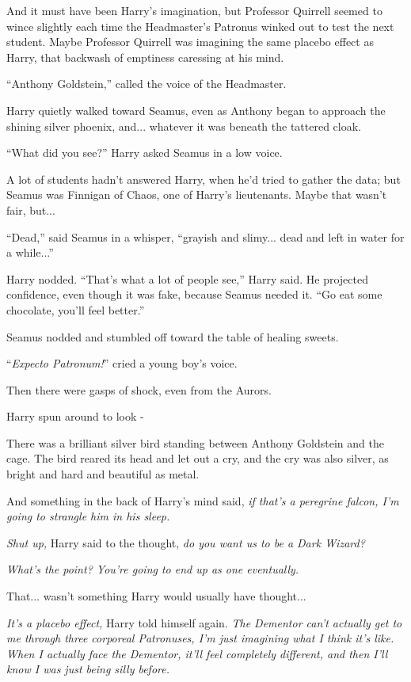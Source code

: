 And it must have been Harry's imagination, but Professor Quirrell seemed to wince slightly each time the Headmaster's Patronus winked out to test the next student. Maybe Professor Quirrell was imagining the same placebo effect as Harry, that backwash of emptiness caressing at his mind.

``Anthony Goldstein,'' called the voice of the Headmaster.

Harry quietly walked toward Seamus, even as Anthony began to approach the shining silver phoenix, and... whatever it was beneath the tattered cloak.

``What did you see?'' Harry asked Seamus in a low voice.

A lot of students hadn't answered Harry, when he'd tried to gather the data; but Seamus was Finnigan of Chaos, one of Harry's lieutenants. Maybe that wasn't fair, but...

``Dead,'' said Seamus in a whisper, ``grayish and slimy... dead and left in water for a while...''

Harry nodded. ``That's what a lot of people see,'' Harry said. He projected confidence, even though it was fake, because Seamus needed it. ``Go eat some chocolate, you'll feel better.''

Seamus nodded and stumbled off toward the table of healing sweets.

``\emph{Expecto Patronum!}'' cried a young boy's voice.

Then there were gasps of shock, even from the Aurors.

Harry spun around to look -

There was a brilliant silver bird standing between Anthony Goldstein and the cage. The bird reared its head and let out a cry, and the cry was also silver, as bright and hard and beautiful as metal.

And something in the back of Harry's mind said, \emph{if that's a peregrine falcon, I'm going to strangle him in his sleep.}

\emph{Shut up,} Harry said to the thought, \emph{do you want us to be a Dark Wizard?}

\emph{What's the point? You're going to end up as one eventually.}

That... wasn't something Harry would usually have thought...

\emph{It's a placebo effect,} Harry told himself again. \emph{The Dementor can't actually get to me through three corporeal Patronuses, I'm just imagining what I think it's like. When I actually face the Dementor, it'll feel completely different, and then I'll know I was just being silly before.}

